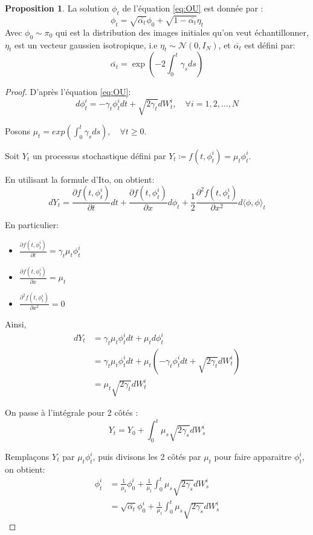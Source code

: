 \documentclass[a4paper,10pt]{article}
\theoremstyle{definition} %
\theoremstyle{definition} %
\newtheorem{proposition}[definition]{Proposition}
\theoremstyle{definition} %
\theoremstyle{definition} %
\begin{document}
\begin{proposition}
    La solution $\phi_t$ de l'équation \eqref{eq:OU} est donnée par :
    \begin{equation}\label{eq:solforphi}
        \phi_t = \sqrt{\bar{\alpha_t}}\phi_0 + \sqrt{1-\bar{\alpha_t}}\eta_t
    \end{equation}
    Avec $\phi_0 \sim \pi_0$ qui est la distribution des images initiales qu'on veut échantillonner, $\eta_t$ est un vecteur gaussien isotropique, i.e $\eta_t \sim \mathcal{N}(0, I_N)$, et $\bar{\alpha_t}$ est défini par: \[\bar{\alpha_t} = \exp{\left(-2\int_0^t \gamma_s ds\right)}\]
\end{proposition}
\begin{proof}
    D'après l'équation \eqref{eq:OU}:
    \[d\phi_t^i = -\gamma_t \phi_t^i dt + \sqrt{2\gamma_t}dW_t^i, \quad \forall i=1,2,\dots,N\] 
    
    Posons $\mu_t = exp{\left(\int_0^t \gamma_s ds\right)}, \quad \forall t \geq 0$.
    
    Soit $Y_t$ un processus stochastique défini par $Y_t \coloneqq f(t,\phi_t^i)= \mu_t \phi_t^i$.
    
    En utilisant la formule d'Ito, on obtient:
    \[dY_t = \frac{\partial f(t,\phi_t^i)}{\partial t} dt + \frac{\partial f(t,\phi_t^i)}{\partial x} d\phi_t + \frac{1}{2}\frac{\partial^2f(t,\phi_t^i)}{\partial x^2}d\langle\phi,\phi\rangle_t\]

    En particulier:
    \begin{itemize}
        \item $\frac{\partial f(t,\phi_t^i)}{\partial t} = \gamma_t \mu_t \phi_t^i$
        \item $\frac{\partial f(t,\phi_t^i)}{\partial x} = \mu_t$
        \item $\frac{\partial^2f(t,\phi_t^i)}{\partial x^2}=0$
    \end{itemize}

    Ainsi,
    \begin{align*}
        dY_t &= \gamma_t \mu_t \phi_t^i dt + \mu_t d\phi_t^i\\
        &= \gamma_t \mu_t \phi_t^i dt + \mu_t (-\gamma_t \phi_t^i dt + \sqrt{2\gamma_t}dW_t^i)\\
        &= \mu_t\sqrt{2\gamma_t}dW_t^i
    \end{align*}
    
    On passe à l'intégrale pour 2 côtés :
    \[Y_t = Y_0 + \int_0^t \mu_s\sqrt{2\gamma_s}dW_s^i\]

    Remplaçons $Y_t$ par $\mu_t \phi_t^i$, puis divisons les 2 côtés par $\mu_t$ pour faire apparaitre $\phi_t^i$, on obtient:
    \begin{align*}
        \phi_t^i &= \frac{1}{\mu_t}\phi_0^i + \frac{1}{\mu_t} \int_0^t \mu_s\sqrt{2\gamma_s}dW_s^i \\
        &= \sqrt{\bar{\alpha_t}}\phi_0^i + \frac{1}{\mu_t} \int_0^t \mu_s\sqrt{2\gamma_s}dW_s^i
    \end{align*}


\end{proof}
\end{document}
